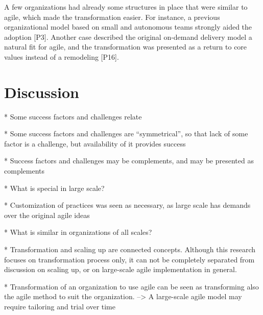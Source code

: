 \documentclass[preprint,authoryear,12pt]{elsarticle}
\begin{document}

A few organizations had already some structures in place that were similar to
agile, which made the transformation easier.
For instance, a previous organizational model based on small and autonomous
teams strongly aided the adoption [P3].
Another case described the original on-demand delivery model a natural fit for
agile, and the transformation was presented as a return to core values instead
of a remodeling [P16].














\section{Discussion}
\label{sec:discussion}

* Some success factors and challenges relate

* Some success factors and challenges are ``symmetrical'', so that lack of some
  factor is a challenge, but availability of it provides success

* Success factors and challenges may be complements, and may be presented as
  complements

* What is special in large scale?

* Customization of practices was seen as necessary, as large scale has demands
  over the original agile ideas

* What is similar in organizations of all scales?

* Transformation and scaling up are connected concepts. Although this research
  focuses on transformation process only, it can not be completely separated
  from discussion on scaling up, or on large-scale agile implementation in
  general.

* Transformation of an organization to use agile can be seen as transforming
  also the agile method to suit the organization.
  --> A large-scale agile model may require tailoring and trial over time
\end{document}
